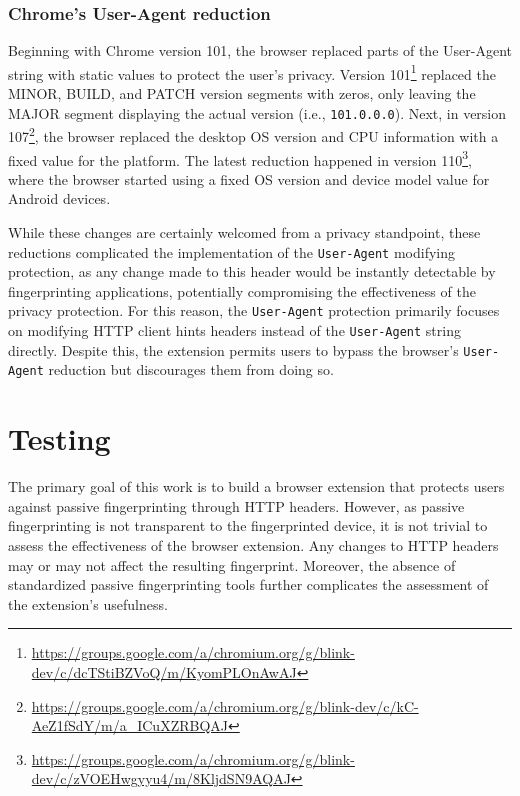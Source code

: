 \subsection{Chrome's User-Agent reduction}
\label{SubSection:UserAgentReduction}

Beginning with Chrome version 101, the browser replaced parts of the User-Agent string with static values to protect the user's privacy. Version 101\footnote{\url{https://groups.google.com/a/chromium.org/g/blink-dev/c/dcTStiBZVoQ/m/KyomPLOnAwAJ}} replaced the MINOR, BUILD, and PATCH version segments with zeros, only leaving the MAJOR segment displaying the actual version (i.e., \texttt{101.0.0.0}). Next, in version 107\footnote{\url{https://groups.google.com/a/chromium.org/g/blink-dev/c/kC-AeZ1fSdY/m/a_ICuXZRBQAJ}}, the browser replaced the desktop OS version and CPU information with a fixed value for the platform. The latest reduction happened in version 110\footnote{\url{https://groups.google.com/a/chromium.org/g/blink-dev/c/zVOEHwgyyu4/m/8KljdSN9AQAJ}}, where the browser started using a fixed OS version and device model value for Android devices.

While these changes are certainly welcomed from a privacy standpoint, these reductions complicated the implementation of the \texttt{User-Agent} modifying protection, as any change made to this header would be instantly detectable by fingerprinting applications, potentially compromising the effectiveness of the privacy protection. For this reason, the \texttt{User-Agent} protection primarily focuses on modifying HTTP client hints headers instead of the \texttt{User-Agent} string directly. Despite this, the extension permits users to bypass the browser's \texttt{User-Agent} reduction but discourages them from doing so.


\chapter{Testing}

The primary goal of this work is to build a browser extension that protects users against passive fingerprinting through HTTP headers. However, as passive fingerprinting is not transparent to the fingerprinted device, it is not trivial to assess the effectiveness of the browser extension. Any changes to HTTP headers may or may not affect the resulting fingerprint. Moreover, the absence of standardized passive fingerprinting tools further complicates the assessment of the extension's usefulness.

